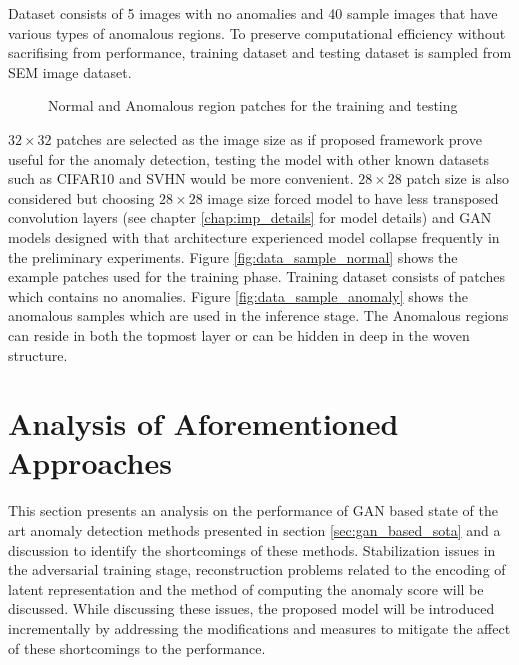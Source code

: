 Dataset consists of 5 images with no anomalies and 40 sample images that have various types of
anomalous regions. To preserve computational efficiency without sacrifising from performance,
training dataset and testing dataset is sampled from SEM image dataset.
\begin{figure}[h!] 
	\hspace*{\fill} 
	\caption{Normal and Anomalous region patches for the training and testing}
	\label{fig:data_samples}
\end{figure}

$32 \times 32$ patches are selected as the image size as if proposed framework prove useful for the
anomaly detection, testing the model with other known datasets such as CIFAR10 \cite{cifar10} and
SVHN \cite{Netzer2011ReadingDI} would be more convenient. $28 \times 28$ patch size is also
considered but choosing $28 \times 28$ image size forced model to have less transposed convolution
layers (see chapter \ref{chap:imp_details} for model details) and GAN models designed with that
architecture experienced model collapse frequently in the preliminary experiments. Figure
\ref{fig:data_sample_normal} shows the example patches used for the training phase. Training dataset
consists of patches which contains no anomalies. Figure \ref{fig:data_sample_anomaly} shows the
anomalous samples which are used in the inference stage. The Anomalous regions can reside in both
the topmost layer or can be hidden in deep in the woven structure.

\section{Analysis of Aforementioned Approaches}
\label{sec:analysis_before}

This section presents an analysis on the performance of GAN based state of the art anomaly detection
methods presented in section \ref{sec:gan_based_sota} and a discussion to identify the shortcomings
of these methods. Stabilization issues in the adversarial training stage, reconstruction problems
related to the encoding of latent representation and the method of computing the anomaly score will
be discussed. While discussing these issues, the proposed model will be introduced incrementally by
addressing the modifications and measures to mitigate the affect of these shortcomings to the
performance.

